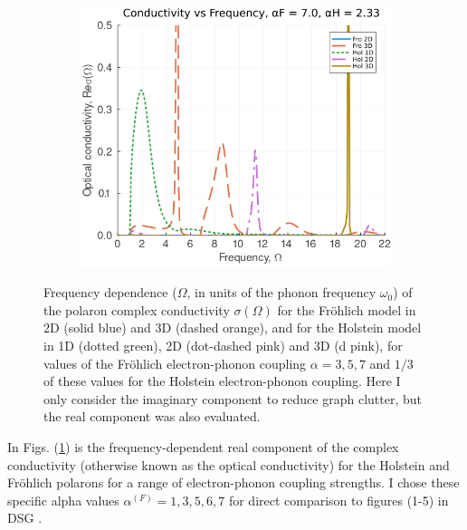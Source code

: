 \begin{figure}[!tbp]
\begin{subfigure}[b]{0.49\textwidth}
    \includegraphics[width=\textwidth]{figures/re_con_freq_7_233.png}
  \end{subfigure}
  \caption{Frequency dependence ($\Omega$, in units of the phonon frequency $\omega_0$) of the polaron complex conductivity $\sigma(\Omega)$ for the Fr\"ohlich model in 2D (solid blue) and 3D (dashed orange), and for the Holstein model in 1D (dotted green), 2D (dot-dashed pink) and 3D (d pink), for values of the Fr\"ohlich electron-phonon coupling $\alpha = 3, 5, 7$ and $1/3$ of these values for the Holstein electron-phonon coupling. Here I only consider the imaginary component to reduce graph clutter, but the real component was also evaluated.}
  \label{fig:re_con_freq}
\end{figure}

In Figs. (\ref{fig:re_con_freq}) is the frequency-dependent real component of the complex conductivity (otherwise known as the optical conductivity) for the Holstein and Fr\"ohlich polarons for a range of electron-phonon coupling strengths. I chose these specific alpha values $\alpha^{(F)} = 1, 3, 5, 6, 7$ for direct comparison to figures (1-5) in DSG \cite{Devreese1972}.
\newline

